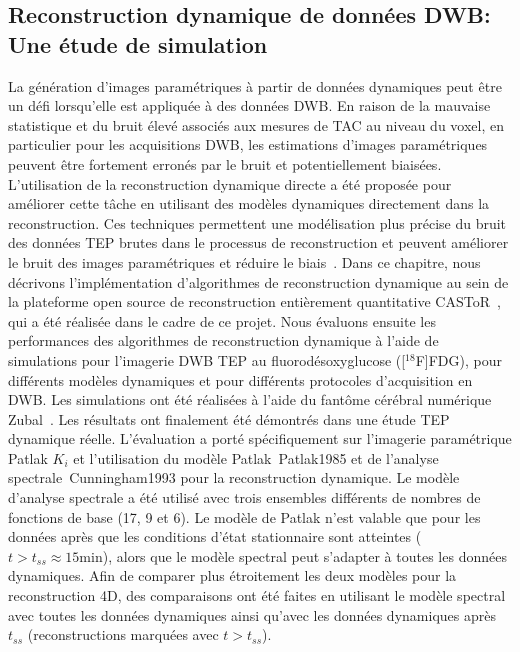 \subsection*{Reconstruction dynamique de données DWB: Une étude de simulation}
La génération d'images paramétriques à partir de données dynamiques peut être un défi lorsqu'elle est appliquée à des données DWB.
En raison de la mauvaise statistique et du bruit élevé associés aux mesures de TAC au niveau du voxel, en particulier pour les acquisitions DWB, les estimations d'images paramétriques peuvent être fortement erronés par le bruit et potentiellement biaisées. 
L'utilisation de la reconstruction dynamique directe a été proposée pour améliorer cette tâche en utilisant des modèles dynamiques directement dans la reconstruction. Ces techniques permettent une modélisation plus précise du bruit des données TEP brutes dans le processus de reconstruction et peuvent améliorer le bruit des images paramétriques et réduire le biais~\cite{Reader2014}. 
Dans ce chapitre, nous décrivons l'implémentation d'algorithmes de reconstruction dynamique au sein de la plateforme open source de reconstruction entièrement quantitative CASToR~\cite{Merlin2018}, qui a été réalisée dans le cadre de ce projet. Nous évaluons ensuite les performances des algorithmes de reconstruction dynamique à l'aide de simulations pour l'imagerie DWB TEP au fluorodésoxyglucose ([$^{18}$F]FDG), pour différents modèles dynamiques et pour différents protocoles d'acquisition en DWB. Les simulations ont été réalisées à l'aide du fantôme cérébral numérique Zubal~\cite{Zubal1994}. Les résultats ont finalement été démontrés dans une étude TEP dynamique réelle.
L'évaluation a porté spécifiquement sur l'imagerie paramétrique Patlak $K_i$ et l'utilisation du modèle Patlak~{Patlak1985} et de l'analyse spectrale~{Cunningham1993} pour la reconstruction dynamique. Le modèle d'analyse spectrale a été utilisé avec trois ensembles différents de nombres de fonctions de base (17, 9 et 6). Le modèle de Patlak n'est valable que pour les données après que les conditions d'état stationnaire sont atteintes ($t>t_{ss}\approx\mathrm{15 min}$), alors que le modèle spectral peut s'adapter à toutes les données dynamiques. Afin de comparer plus étroitement les deux modèles pour la reconstruction 4D, des comparaisons ont été faites en utilisant le modèle spectral avec toutes les données dynamiques ainsi qu'avec les données dynamiques après $t_{ss}$ (reconstructions marquées avec $t > t_{ss}$).

